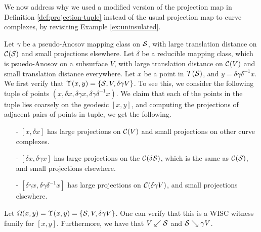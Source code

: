 We now address why we used a modified version of the projection map in Definition \ref{def:projection-tuple} instead of the usual projection map to curve complexes, by revisiting Example \ref{ex:uninsulated}.
\begin{example}
  \label{ex:need-for-modified-projection}
  Let $\gamma$ be a pseudo-Anosov mapping class on $\mathcal{S}$, with large translation distance on $\mathcal{C}(\mathcal{S})$ and small projections elsewhere.
  Let $\delta$ be a reducible mapping class, which is psuedo-Anosov on a subsurface $V$, with large translation distance on $\mathcal{C}(V)$ and small translation distance everywhere.
  Let $x$ be a point in $\mathcal{T}(\mathcal{S})$, and $y = \delta \gamma \delta^{-1} x$.
  We first verify that $\Upsilon(x,y) = \left\{ \mathcal{S}, V, \delta \gamma V \right\}$.
  To see this, we consider the following tuple of points $(x, \delta x, \delta \gamma x, \delta \gamma \delta^{-1}x)$.
  We claim that each of the points in the tuple lies coarsely on the geodesic $[x,y]$, and computing the projections of adjacent pairs of points in tuple, we get the following.
  \begin{itemize}
  \item[-] $[x, \delta x]$ has large projections on $\mathcal{C}(V)$ and small projections on other curve complexes.
  \item[-] $[\delta x, \delta \gamma x]$ has large projections on the $\mathcal{C}(\delta \mathcal{S})$, which is the same as $\mathcal{C}(\mathcal{S})$, and small projections elsewhere.
  \item[-] $[\delta \gamma x, \delta \gamma \delta^{-1} x]$ has large projections on $\mathcal{C}(\delta \gamma V)$, and small projections elsewhere.
  \end{itemize}
  Let $\Omega(x, y) = \Upsilon(x,y) = \left\{ \mathcal{S}, V, \delta \gamma V \right\}$.
  One can verify that this is a WISC witness family for $[x,y]$.
  Furthermore, we have that $V \swarrow \mathcal{S}$ and $\mathcal{S} \searrow \gamma V$.


\end{example}
